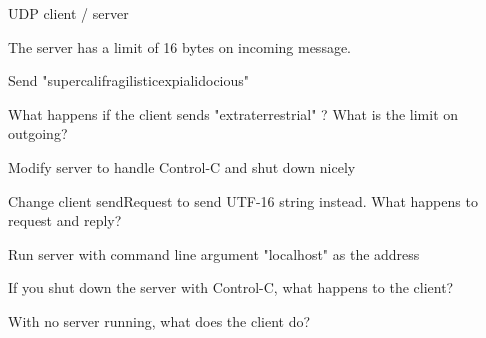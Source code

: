 
UDP client / server

The server has a limit of 16 bytes on incoming message.

Send "supercalifragilisticexpialidocious"

What happens if the client sends "extraterrestrial" ?
What is the limit on outgoing?

Modify server to handle Control-C and shut down nicely

Change client sendRequest to send UTF-16 string instead. What happens to request and reply?

Run server with command line argument "localhost" as the address

If you shut down the server with Control-C, what happens to the client?

With no server running, what does the client do?
